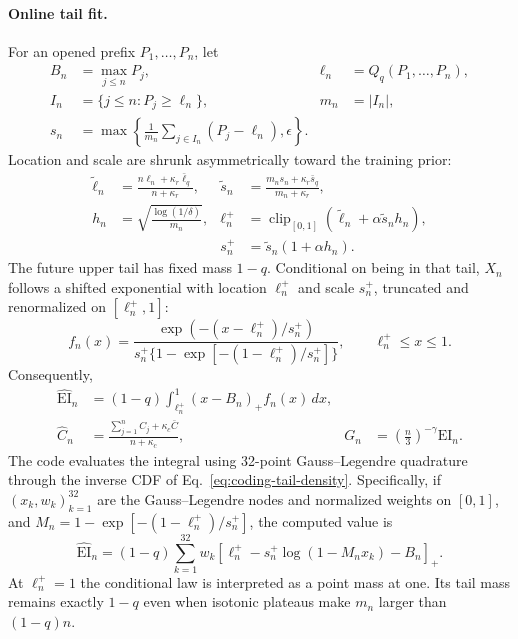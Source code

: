 \paragraph{Online tail fit.}
For an opened prefix $P_1,\ldots,P_n$, let
\begin{align}
  B_n&=\max_{j\le n}P_j,
  &\ell_n&=Q_q(P_1,\ldots,P_n),\\
  I_n&=\{j\le n:P_j\ge\ell_n\},
  &m_n&=|I_n|,\\
  s_n&=\max\!\left\{
    \frac{1}{m_n}\sum_{j\in I_n}(P_j-\ell_n),\epsilon
  \right\}.
\end{align}
Location and scale are shrunk asymmetrically toward the training prior:
\begin{align}
  \widetilde\ell_n&=\frac{n\ell_n+\kappa_r\bar\ell_q}{n+\kappa_r},
  &\widetilde s_n&=\frac{m_ns_n+\kappa_r\bar s_q}{m_n+\kappa_r},\\
  h_n&=\sqrt{\frac{\log(1/\delta)}{m_n}},
  &\ell_n^+&=\operatorname{clip}_{[0,1]}
     (\widetilde\ell_n+\alpha\widetilde s_nh_n),\\
  &&s_n^+&=\widetilde s_n(1+\alpha h_n).
  \label{eq:coding-ucb}
\end{align}
The future upper tail has fixed mass $1-q$.  Conditional on being in that
tail, $X_n$ follows a shifted exponential with location $\ell_n^+$ and scale
$s_n^+$, truncated and renormalized on $[\ell_n^+,1]$:
\begin{equation}
 f_n(x)=
 \frac{\exp(-(x-\ell_n^+)/s_n^+)}
 {s_n^+\{1-\exp[-(1-\ell_n^+)/s_n^+]\}},
 \qquad \ell_n^+\le x\le1.
 \label{eq:coding-tail-density}
\end{equation}
Consequently,
\begin{align}
  \widehat{\mathrm{EI}}_n
  &=(1-q)\int_{\ell_n^+}^{1}(x-B_n)_+f_n(x)\,dx,\\
  \widehat C_n&=
  \frac{\sum_{j=1}^{n}C_j+\kappa_c\bar C}{n+\kappa_c},
  &G_n&=\left(\frac n3\right)^{-\gamma}\widehat{\mathrm{EI}}_n.
  \label{eq:coding-ei}
\end{align}
The code evaluates the integral using 32-point Gauss--Legendre quadrature
through the inverse CDF of Eq.~\eqref{eq:coding-tail-density}.  Specifically,
if $(x_k,w_k)_{k=1}^{32}$ are the Gauss--Legendre nodes and normalized weights
on $[0,1]$, and
$M_n=1-\exp[-(1-\ell_n^+)/s_n^+]$, the computed value is
\begin{equation}
 \widehat{\mathrm{EI}}_n=(1-q)\sum_{k=1}^{32}w_k
 \left[\ell_n^+-s_n^+\log(1-M_nx_k)-B_n\right]_+.
 \label{eq:coding-quadrature}
\end{equation}
At $\ell_n^+=1$ the conditional law is interpreted as a point mass at one.
Its tail mass remains exactly $1-q$ even when isotonic plateaus make $m_n$
larger than $(1-q)n$.

